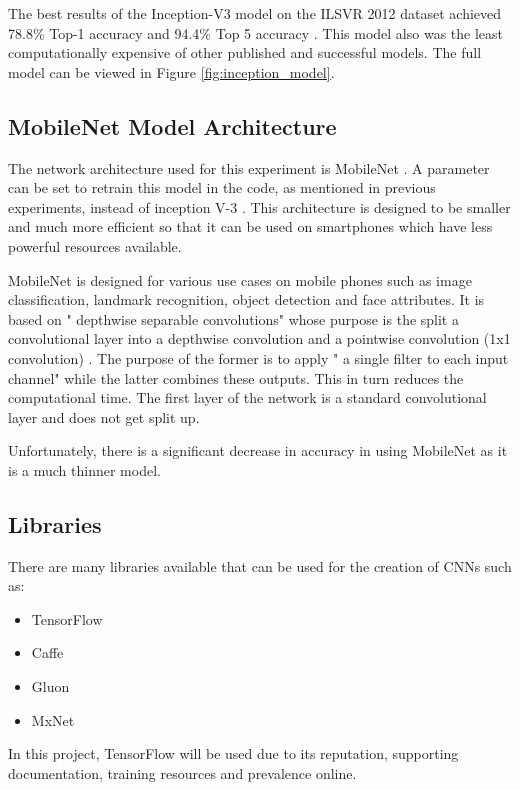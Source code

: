 The best results of the Inception-V3 model on the ILSVR 2012 dataset achieved 78.8\% Top-1 accuracy and 94.4\% Top 5 accuracy \parencite{rethinkingInception}.
This model also was the least computationally expensive of other published and successful models.
The full model can be viewed in Figure \ref{fig:inception_model}.

\clearpage

\tocless\subsection{MobileNet Model Architecture}
The network architecture used for this experiment is MobileNet \parencite{mobilenet}.
A parameter can be set to retrain this model in the code, as mentioned in previous experiments, instead of inception V-3 \parencite{retrainInception}. 
This architecture is designed to be smaller and much more efficient so that
it can be used on smartphones which have less powerful resources available.

MobileNet is designed for various use cases on mobile phones such as image classification, landmark recognition, object detection and face attributes.
It is based on " depthwise separable convolutions" whose purpose is the split a convolutional layer into a depthwise convolution and a pointwise convolution (1x1 convolution) \parencite{mobilenet}.
The purpose of the former is to apply " a single filter to each input channel" \parencite{mobilenet} while the latter combines these outputs.
This in turn reduces the computational time.
The first layer of the network is a standard convolutional layer and does not get split up.

Unfortunately, there is a significant decrease in accuracy in using MobileNet as it is a much thinner model.

\tocless\subsection{Libraries}
There are many libraries available that can be used for the creation of CNNs such as:
\begin{itemize}
    \item{TensorFlow}
    \item{Caffe}
    \item{Gluon}
    \item{MxNet}
\end{itemize}
In this project, TensorFlow will be used due to its reputation, supporting documentation, training resources and prevalence online.

